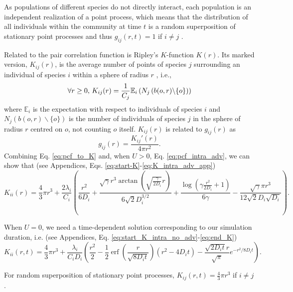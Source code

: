 \documentclass[english]{article}
\DeclareMathOperator\erf{erf}
\begin{document}
As populations of different species do not directly interact, each
population is an independent realization of a point process, which
means that the distribution of all individuals within the community
at time $t$ is a random superposition of stationary point processes
and thus $g_{ij}(r,t)=1$ if $i\neq j$ \citep[ p. 326, eq. 5.3.13]{illian2008statistical}.\medskip{}

Related to the pair correlation function is Ripley's $K$-function
$K(r)$. Its marked version, $K_{ij}(r)$, is the average number of
points of species $j$ surrounding an individual of species $i$ within
a sphere of radius $r$ \citep{illian2008statistical}, i.e.,
\begin{equation}
\forall r\geq0\textmd{, }K_{ij}(r)=\frac{1}{C_{j}}\mathbb{E}_{i}\left(N_{j}\left(b(o,r)\backslash\{o\}\right)\right)
\end{equation}
where $\mathbb{E}_{i}$ is the expectation with respect to individuals
of species $i$ and $N_{j}\left(b(o,r)\backslash\{o\}\right)$ is
the number of individuals of species $j$ in the sphere of radius
$r$ centred on $o$, not counting $o$ itself. $K_{ij}(r)$ is related
to $g_{ij}(r)$ as
\begin{equation}
g_{ij}(r)=\frac{K_{ij}'(r)}{4\pi r^{2}}.\label{eq:pcf_to_K}
\end{equation}
Combining Eq. \ref{eq:pcf_to_K} and, when $U>0$, Eq. \ref{eq:pcf_intra_adv},
we can show that (see Appendices, Eqs. \ref{eq:start-K}-\ref{eq:K_intra_adv_app})
\begin{equation}
K_{ii}(r)=\frac{4}{3}\pi r^{3}+\frac{2\lambda_i}{C_{i}}\left(\frac{r^{2}}{6D_i}+\frac{\sqrt{\gamma}r^{3}\arctan(\sqrt{\frac{\gamma}{2D_i}}r)}{6\sqrt{2}D_i^{3/2}}+\frac{\log\left(\gamma\frac{r^{2}}{2D_i}+1\right)}{6\gamma}-\frac{\sqrt{\gamma}\pi r^{3}}{12\sqrt{2}D_i\sqrt{D_i}}\right).\label{eq:K_intra_adv}
\end{equation}

When $U=0$, we need a time-dependent solution corresponding to our
simulation duration, i.e. (see Appendices, Eq. \ref{eq:start_K_intra_no_adv}-\ref{eq:end_K})
\begin{equation}
K_{ii}(r,t)=\frac{4}{3}\pi r^{3}+\frac{\lambda_i}{C_{i}D_i}\left(\frac{r^{2}}{2}-\frac{1}{2}\erf(\frac{r}{\sqrt{8D_i t}})(r^{2}-4D_i t)-\frac{\sqrt{2D_i t}r}{\sqrt{\pi}}e^{-r^{2}/8D_i t}\right).\label{eq:K_intra_no_adv}
\end{equation}

For random superposition of stationary point processes, $K_{ij}(r,t)=\frac{4}{3}\pi r^{3}$
if $i\neq j$ \citep[p. 324, eq. 5.3.5]{illian2008statistical}.
\end{document}
